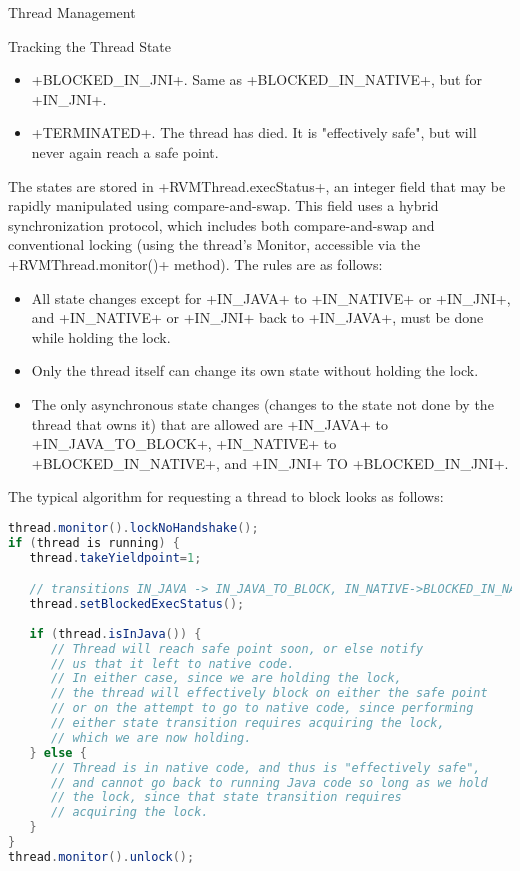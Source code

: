 \begin{section}{Thread Management}
\begin{subsection}{Tracking the Thread State}
\begin{itemize}
  \item \spverb+BLOCKED_IN_JNI+. Same as \spverb+BLOCKED_IN_NATIVE+, but for \spverb+IN_JNI+.
  \item \spverb+TERMINATED+. The thread has died. It is "effectively safe", but will never again reach a safe point.
\end{itemize}

The states are stored in \spverb+RVMThread.execStatus+, an integer field that may be rapidly manipulated using compare-and-swap. This field uses a hybrid synchronization protocol, which includes both compare-and-swap and conventional locking (using the thread's Monitor, accessible via the \spverb+RVMThread.monitor()+ method). The rules are as follows:

\begin{itemize}
  \item All state changes except for \spverb+IN_JAVA+ to \spverb+IN_NATIVE+ or \spverb+IN_JNI+, and \newline \spverb+IN_NATIVE+ or \spverb+IN_JNI+ back to \spverb+IN_JAVA+, must be done while holding the lock.
  \item Only the thread itself can change its own state without holding the lock.
  \item The only asynchronous state changes (changes to the state not done by the thread that owns it) that are allowed are \spverb+IN_JAVA+ to \spverb+IN_JAVA_TO_BLOCK+, \spverb+IN_NATIVE+ to \spverb+BLOCKED_IN_NATIVE+, and \spverb+IN_JNI+ TO \spverb+BLOCKED_IN_JNI+.
\end{itemize}

The typical algorithm for requesting a thread to block looks as follows:

\begin{lstlisting}[language=Java]
thread.monitor().lockNoHandshake();
if (thread is running) {
   thread.takeYieldpoint=1;

   // transitions IN_JAVA -> IN_JAVA_TO_BLOCK, IN_NATIVE->BLOCKED_IN_NATIVE, etc.
   thread.setBlockedExecStatus(); 
   
   if (thread.isInJava()) {
      // Thread will reach safe point soon, or else notify 
      // us that it left to native code.
      // In either case, since we are holding the lock, 
      // the thread will effectively block on either the safe point
      // or on the attempt to go to native code, since performing
      // either state transition requires acquiring the lock,
      // which we are now holding.
   } else {
      // Thread is in native code, and thus is "effectively safe",
      // and cannot go back to running Java code so long as we hold
      // the lock, since that state transition requires
      // acquiring the lock.
   }
}
thread.monitor().unlock();
\end{lstlisting}


\end{subsection}
\end{section}
